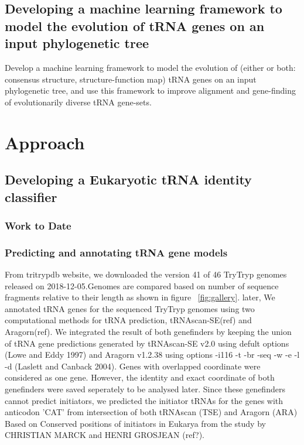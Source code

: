 \documentclass[
10pt, %
a4paper, %
oneside, %
headinclude,footinclude, %
BCOR5mm, %
]{scrartcl}
\begin{document}
\subsection{\textbf{Developing a machine learning framework to model the evolution of tRNA genes on an input phylogenetic tree}}
Develop a machine learning framework to model the evolution of (either or both: {consensus structure, structure-function map}) tRNA genes on an input phylogenetic tree, and use this framework to improve alignment and gene-finding of evolutionarily diverse tRNA gene-sets.
\section{Approach}
\subsection{\textbf{Developing a Eukaryotic tRNA identity classifier}}

\subsubsection*{\textbf{Work to Date}}
 
\subsubsection*{Predicting and annotating tRNA gene models}
From tritrypdb website, we downloaded the version 41 of 46 TryTryp genomes released on 2018-12-05.Genomes are compared based on number of sequence fragments relative to their length as shown in figure ~\vref{fig:gallery}. later, We annotated tRNA genes for the sequenced TryTryp genomes using two computational methods for tRNA prediction, tRNAscan-SE(ref) and Aragorn(ref). We integrated the result of both genefinders by keeping the union of tRNA gene predictions generated by tRNAscan-SE v2.0 using defult options (Lowe and Eddy 1997) and Aragorn v1.2.38 using options -i116 -t -br -seq -w -e -l -d (Laslett and Canback 2004). Genes with overlapped coordinate were considered as one gene. However, the identity and exact coordinate of both genefinders were saved seperately to be analysed later. Since these genefinders cannot predict initiators, we predicted the initiator tRNAs for the genes with anticodon 'CAT' from intersection of both tRNAscan (TSE) and Aragorn (ARA) Based on Conserved positions of initiators in Eukarya from the study by CHRISTIAN MARCK and HENRI GROSJEAN (ref?).
\end{document}
